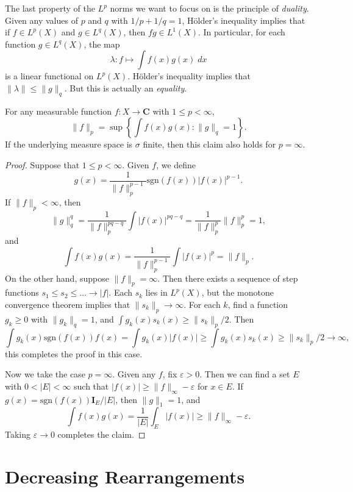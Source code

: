 The last property of the $L^p$ norms we want to focus on is the principle of \emph{duality}. Given any values of $p$ and $q$ with $1/p + 1/q = 1$, H\"{o}lder's inequality implies that if $f \in L^p(X)$ and $g \in L^q(X)$, then $fg \in L^1(X)$. In particular, for each function $g \in L^q(X)$, the map
%
\[ \lambda: f \mapsto \int f(x)g(x)\; dx \]
%
is a linear functional on $L^p(X)$. H\"{o}lder's inequality implies that $\| \lambda \| \leq \| g \|_q$. But this is actually an \emph{equality}.

\begin{theorem}
    For any measurable function $f: X \to \mathbf{C}$ with $1 \leq p < \infty$,
    \[ \| f \|_p = \sup \left\{ \int f(x)g(x) : \| g \|_q = 1 \right\}. \]
    If the underlying measure space is $\sigma$ finite, then this claim also holds for $p = \infty$.
\end{theorem}
\begin{proof}
    Suppose that $1 \leq p < \infty$. Given $f$, we define
    \[ g(x) = \frac{1}{\| f \|_p^{p-1}} \text{sgn}(f(x)) |f(x)|^{p-1}. \]
    If $\| f \|_p < \infty$, then
    \[ \| g \|_q^q = \frac{1}{\| f \|_p^{pq - q}} \int |f(x)|^{pq-q} = \frac{1}{\| f \|_p^p} \| f \|_p^p = 1, \]
    and
    \[ \int f(x) g(x) = \frac{1}{\| f \|_p^{p-1}} \int |f(x)|^p = \| f \|_p. \]
    On the other hand, suppose $\| f \|_p = \infty$. Then there exists a sequence of step functions $s_1 \leq s_2 \leq \dots \to |f|$. Each $s_k$ lies in $L^p(X)$, but the monotone convergence theorem implies that $\| s_k \|_p \to \infty$. For each $k$, find a function $g_k \geq 0$ with $\| g_k \|_q = 1$, and $\int g_k(x) s_k(x) \geq \| s_k \|_p / 2$. Then
    \[ \int g_k(x) \text{sgn}(f(x)) f(x) = \int g_k(x) |f(x)| \geq \int g_k(x) s_k(x) \geq \| s_k \|_p / 2 \to \infty, \]
    this completes the proof in this case. 

    Now we take the case $p = \infty$. Given any $f$, fix $\varepsilon > 0$. Then we can find a set $E$ with $0 < |E| < \infty$ such that $|f(x)| \geq \| f \|_\infty - \varepsilon$ for $x \in E$. If $g(x) = \text{sgn}(f(x)) \mathbf{I}_E / |E|$, then $\| g \|_1 = 1$, and
    \[ \int f(x) g(x) = \frac{1}{|E|} \int_E |f(x)| \geq \| f \|_\infty - \varepsilon. \]
    Taking $\varepsilon \to 0$ completes the claim.
\end{proof}

\section{Decreasing Rearrangements}

